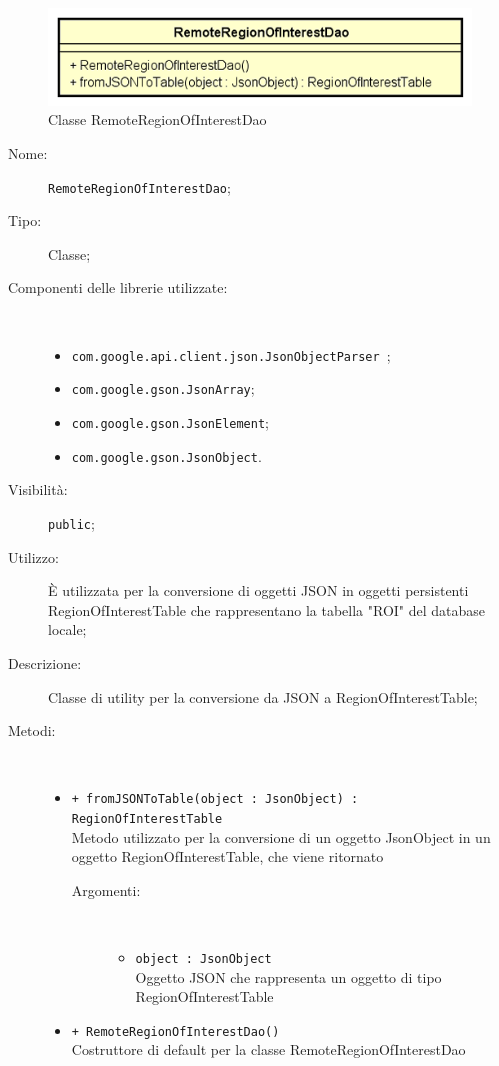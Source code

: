 \documentclass[../DefinizioneDiProdotto.tex]{subfiles}
\begin{document}
    \begin{figure}[H]
        \centering
        \includegraphics{img/RemoteRegionOfInterestDao.png}
        \caption{Classe RemoteRegionOfInterestDao}\label{fig:model::dataaccess::dao::RemoteRegionOfInterestDao} 
    \end{figure}
    \begin{description}
\item[Nome:] \texttt{RemoteRegionOfInterestDao};
\item[Tipo:] Classe;
\item[Componenti delle librerie utilizzate:] \
\begin{itemize}
\item \texttt{com.google.api.client.json.JsonObjectParser
};

\item \texttt{com.google.gson.JsonArray};

\item \texttt{com.google.gson.JsonElement};

\item \texttt{com.google.gson.JsonObject}.

\end{itemize}
\item[Visibilità:] \texttt{public};
\item[Utilizzo:] È utilizzata per la conversione di oggetti JSON in oggetti persistenti RegionOfInterestTable che rappresentano la tabella "ROI" del database locale;
\item[Descrizione:] Classe di utility per la conversione da JSON a RegionOfInterestTable;
\item[Metodi:] \
\begin{itemize}
\item \texttt{+ fromJSONToTable(object : JsonObject) : RegionOfInterestTable}\\
Metodo utilizzato per la conversione di un oggetto JsonObject in un oggetto RegionOfInterestTable, che viene ritornato
 \begin{description}
\item[Argomenti:] \
\begin{itemize}
\item \texttt{object : JsonObject}\\
Oggetto JSON che rappresenta un oggetto di tipo RegionOfInterestTable\end{itemize}
\end{description}
\item \texttt{+ RemoteRegionOfInterestDao()}\\
Costruttore di default per la classe RemoteRegionOfInterestDao
 \end{itemize}
\end{description}
\end{document}
